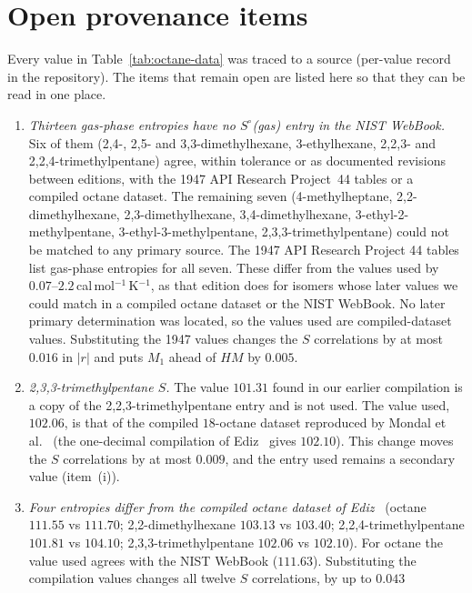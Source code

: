 \documentclass[a5paper, 10pt]{article}
\theoremstyle{plain}
\theoremstyle{remark}
\theoremstyle{definition}
\begin{document}
\section{Open provenance items}\label{sec:s-quality}

Every value in Table~\ref{tab:octane-data} was traced to a source
(per-value record in the repository). The items that remain
open are listed here so that they can be read in one place.
\begin{enumerate}[label=(\roman*)]
\item \emph{Thirteen gas-phase entropies have no $S^{\circ}$(gas) entry
  in the NIST WebBook.} Six of them (2,4-, 2,5- and
  3,3-dimethylhexane, 3-ethylhexane, 2,2,3- and 2,2,4-trimethylpentane)
  agree, within tolerance or as documented revisions between editions,
  with the 1947 API Research Project~44 tables or a compiled octane
  dataset. The remaining seven (4-methylheptane, 2,2-dimethylhexane,
  2,3-dimethylhexane, 3,4-dimethylhexane, 3-ethyl-2-methylpentane, 3-ethyl-3-methylpentane,
  2,3,3-trimethylpentane) could not be matched to any primary source. The 1947 API Research Project 44
  tables~\cite{APIProject44Circ461} list gas-phase entropies for all seven.
  These differ from the values used by $0.07$--$2.2$\,cal\,mol$^{-1}$\,K$^{-1}$,
  as that edition does for isomers whose later values we could match in a compiled octane dataset or the NIST WebBook. No later primary determination was located, so the values used
  are compiled-dataset values. Substituting the 1947 values changes the
  $S$ correlations by at most $0.016$ in $|r|$ and puts $M_1$ ahead of
  $HM$ by $0.005$.
\item \emph{2,3,3-trimethylpentane $S$.} The value $101.31$ found in our
  earlier compilation is a copy of the 2,2,3-trimethylpentane entry and is
  not used. The value used, $102.06$, is that of the compiled
  $18$-octane dataset reproduced by Mondal et al.~\cite{MondalDePal2019QSPR}
  (the one-decimal compilation of Ediz~\cite{Ediz2017Octane} gives
  $102.10$). This change moves the $S$ correlations by at most $0.009$, and the
  entry used remains a secondary value (item~(i)).
\item \emph{Four entropies differ from the compiled octane dataset of
  Ediz~\cite{Ediz2017Octane}} (octane $111.55$ vs $111.70$;
  2,2-dimethylhexane $103.13$ vs $103.40$; 2,2,4-trimethylpentane $101.81$
  vs $104.10$; 2,3,3-trimethylpentane $102.06$ vs $102.10$). For octane
  the value used agrees with the NIST WebBook ($111.63$). Substituting the
  compilation values changes all twelve $S$ correlations, by up to $0.043$

\end{enumerate}
\end{document}
